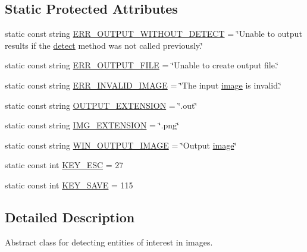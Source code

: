 \subsection*{Static Protected Attributes}
\begin{DoxyCompactItemize}
\item 
static const string \hyperlink{classmultiscale_1_1analysis_1_1Detector_a5837f0e4ffef6410774ff9bcda72238b}{E\-R\-R\-\_\-\-O\-U\-T\-P\-U\-T\-\_\-\-W\-I\-T\-H\-O\-U\-T\-\_\-\-D\-E\-T\-E\-C\-T} = \char`\"{}Unable to output results if the \hyperlink{classmultiscale_1_1analysis_1_1Detector_acfb9aaec94382e4a7bee6d9874d4bcef}{detect} method was not called previously.\char`\"{}
\item 
static const string \hyperlink{classmultiscale_1_1analysis_1_1Detector_aab6b3a68e93cad9a93885e52f1c2ce04}{E\-R\-R\-\_\-\-O\-U\-T\-P\-U\-T\-\_\-\-F\-I\-L\-E} = \char`\"{}Unable to create output file.\char`\"{}
\item 
static const string \hyperlink{classmultiscale_1_1analysis_1_1Detector_aa5dc8982745f567379e0eccd416c6820}{E\-R\-R\-\_\-\-I\-N\-V\-A\-L\-I\-D\-\_\-\-I\-M\-A\-G\-E} = \char`\"{}The input \hyperlink{classmultiscale_1_1analysis_1_1Detector_a523830a6cfe409694ce8327c3c736fbd}{image} is invalid.\char`\"{}
\item 
static const string \hyperlink{classmultiscale_1_1analysis_1_1Detector_a3030def7fe61741fcc8f5c8b50f40e57}{O\-U\-T\-P\-U\-T\-\_\-\-E\-X\-T\-E\-N\-S\-I\-O\-N} = \char`\"{}.out\char`\"{}
\item 
static const string \hyperlink{classmultiscale_1_1analysis_1_1Detector_acc73b4fb215305ffd7f3d6df8807cc5e}{I\-M\-G\-\_\-\-E\-X\-T\-E\-N\-S\-I\-O\-N} = \char`\"{}.png\char`\"{}
\item 
static const string \hyperlink{classmultiscale_1_1analysis_1_1Detector_a883b5de8d273a2bfab31e45bc285c78d}{W\-I\-N\-\_\-\-O\-U\-T\-P\-U\-T\-\_\-\-I\-M\-A\-G\-E} = \char`\"{}Output \hyperlink{classmultiscale_1_1analysis_1_1Detector_a523830a6cfe409694ce8327c3c736fbd}{image}\char`\"{}
\item 
static const int \hyperlink{classmultiscale_1_1analysis_1_1Detector_a0d1f2fd9eae1b166ac097668889c02aa}{K\-E\-Y\-\_\-\-E\-S\-C} = 27
\item 
static const int \hyperlink{classmultiscale_1_1analysis_1_1Detector_aa9acc60392e3eb0f0a9c3019c63301ae}{K\-E\-Y\-\_\-\-S\-A\-V\-E} = 115
\end{DoxyCompactItemize}


\subsection{Detailed Description}
Abstract class for detecting entities of interest in images. 

